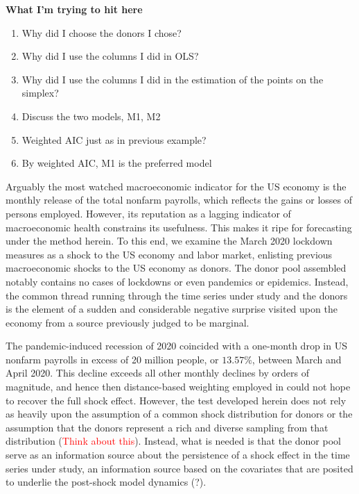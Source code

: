 \documentclass[11pt]{article}
\theoremstyle{definition}
\begin{document}
\textbf{What I'm trying to hit here}
\begin{enumerate}
\item Why did I choose the donors I chose? 
\item Why did I use the columns I did in OLS? 
\item Why did I use the columns I did in the estimation of the points on the simplex? 
\item Discuss the two models, M1, M2 
\item Weighted AIC just as in previous example?  
\item By weighted AIC, M1 is the preferred model 
\end{enumerate}

Arguably the most watched macroeconomic indicator for the US economy is the monthly release of the total nonfarm payrolls, which reflects the gains or losses of persons employed.  However, its reputation as a lagging indicator of macroeconomic health constrains its usefulness.  This makes it ripe for forecasting under the method herein.  To this end, we examine the March 2020 lockdown measures as a shock to the US economy and labor market, enlisting previous macroeconomic shocks to the US economy as donors.  The donor pool assembled notably contains no cases of lockdowns or even pandemics or epidemics.  Instead, the common thread running through the time series under study and the donors is the element of a sudden and considerable negative surprise visited upon the economy from a source previously judged to be marginal.  

The pandemic-induced recession of 2020 coincided with a one-month drop in US nonfarm payrolls in excess of 20 million people, or $13.57\%$, between March and April 2020.  This decline exceeds all other monthly declines by orders of magnitude, and hence then distance-based weighting employed in \citep{lin2021minimizing} could not hope to recover the full shock effect.  However, the test developed herein does not rely as heavily upon the assumption of a common shock distribution for donors or the assumption that the donors represent a rich and diverse sampling from that distribution (\textcolor{red}{Think about this}).  Instead, what is needed is that the donor pool serve as an information source about the persistence of a shock effect in the time series under study, an information source based on the covariates that are posited to underlie the post-shock model dynamics (?).  
\end{document}
